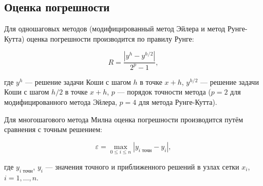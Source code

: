 \subsection{Оценка погрешности}

Для одношаговых методов (модифицированный метод Эйлера и метод Рунге-Кутта) оценка погрешности производится по правилу Рунге:

\[
R = \frac{\left| y^h - y^{h/2} \right|}{2^p - 1},
\]

где $y^h$ — решение задачи Коши с шагом $h$ в точке $x + h$, $y^{h/2}$ — решение задачи Коши с шагом $h/2$ в точке $x + h$, $p$ — порядок точности метода ($p = 2$ для модифицированного метода Эйлера, $p = 4$ для метода Рунге-Кутта).

Для многошагового метода Милна оценка погрешности производится путём сравнения с точным решением:

\[
\varepsilon = \max_{0 \leq i \leq n} \left| y_{i \text{ точн}} - y_i \right|,
\]

где $y_{i \text{ точн}}$, $y_i$ — значения точного и приближенного решений в узлах сетки $x_i$, $i = 1, \dots, n$.
